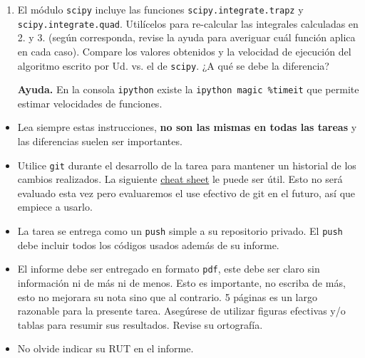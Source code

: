 \documentclass[letter, 11pt]{article}
\begin{document}
\begin{enumerate}
  \item El módulo \texttt{scipy} incluye las funciones
    \texttt{scipy.integrate.trapz} y \texttt{scipy.integrate.quad}.  Utilícelos
    para re-calcular las integrales calculadas en 2. y 3. (según corresponda,
    revise la ayuda para averiguar cuál función aplica en cada caso). Compare
    los valores obtenidos y la velocidad de ejecución del algoritmo escrito por
    Ud. vs. el de \texttt{scipy}. ¿A qué se debe la diferencia?

      \begin{ayuda}
        \small
        {\bf Ayuda.}
        En la consola \texttt{ipython} existe la \texttt{ipython magic
        \%timeit} que permite estimar velocidades de funciones.
      \end{ayuda}

\end{enumerate}



\vspace{1em}
\begin{itemize}
  
  \item Lea siempre estas instrucciones, {\bf no son las mismas en todas las
    tareas} y las diferencias suelen ser importantes.

  \item Utilice \texttt{git} durante el desarrollo de la tarea para mantener un
    historial de los cambios realizados. La siguiente
    \href{https://education.github.com/git-cheat-sheet-education.pdf}{cheat
    sheet} le puede ser útil. Esto no será evaluado esta vez pero evaluaremos
    el use efectivo de git en el futuro, así que empiece a usarlo.

  \item La tarea se entrega como un \texttt{push} simple a su repositorio
    privado. El \texttt{push} debe incluir todos los códigos usados además de
    su informe.

  \item El informe debe ser entregado en formato \texttt{pdf}, este debe ser
    claro sin información ni de más ni de menos. Esto es importante, no escriba
    de más, esto no mejorara su nota sino que al contrario. 5 páginas es un
    largo razonable para la presente tarea.  Asegúrese de utilizar figuras
    efectivas y/o tablas para resumir sus resultados. Revise su ortografía.

  \item No olvide indicar su RUT en el informe.

\end{itemize}

\end{document}
